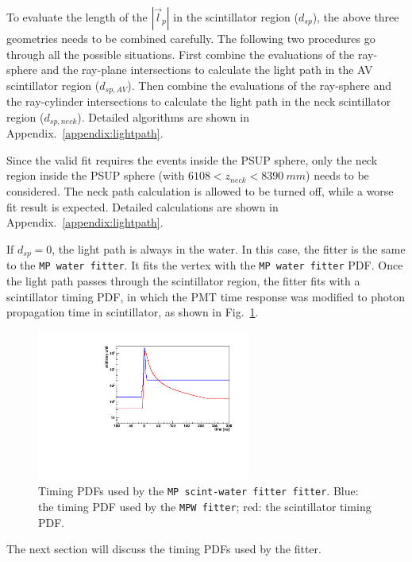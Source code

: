 \begin{itemize}
\end{itemize}

To evaluate the length of the $|\vec{l}_p|$ in the scintillator region ($d_{sp}$), the above three geometries needs to be combined carefully. The following two procedures go through all the possible situations. First combine the evaluations of the ray-sphere and the ray-plane intersections to calculate the light path in the AV scintillator region ($d_{sp,AV}$). Then combine the evaluations of the ray-sphere and the ray-cylinder intersections to calculate the light path in the neck scintillator region ($d_{sp,neck}$). Detailed algorithms are shown in Appendix.~\ref{appendix:lightpath}.

Since the valid fit requires the events inside the PSUP sphere, only the neck region inside the PSUP sphere (with $6108<z_{neck}<8390~mm$) needs to be considered. The neck path calculation is allowed to be turned off, while a worse fit result is expected. Detailed calculations are shown in Appendix.~\ref{appendix:lightpath}.

If $d_{sp}=0$, the light path is always in the water. In this case, the fitter is the same to the \texttt{MP water fitter}. It fits the vertex with the \texttt{MP water fitter} PDF. Once the light path passes through the scintillator region, the fitter fits with a scintillator timing PDF, in which the PMT time response was modified to photon propagation time in scintillator, as shown in Fig.~\ref{partialpdf}.

\begin{figure}[htbp]
	\centering	
	\includegraphics[width=7cm]{scintpdf.pdf}
	\caption[Timing PDFs used by the \texttt{MP scint-water fitter fitter}.]{Timing PDFs used by the \texttt{MP scint-water fitter fitter}. Blue: the timing PDF used by the \texttt{MPW fitter}; red: the scintillator timing PDF.}
	\label{partialpdf}
\end{figure}

The next section will discuss the timing PDFs used by the fitter.

